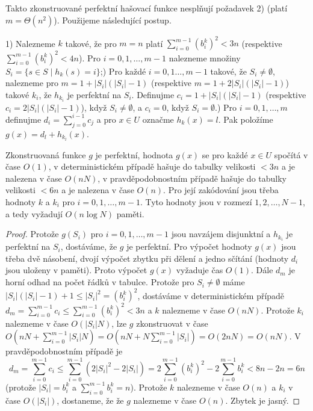 \documentclass[a4paper,12pt]{article}
\begin{document}
Takto zkonstruované perfektní hašovací funkce 
nesplňují poža\-davek 2) (platí $m=\Theta (n^2)$).  Použijeme následující 
postup. 

1) Nalezneme $k$ takové, že pro $m=n$ platí 
$\sum_{i=0}^{m-1}(b_i^k)^2<3n$ (respektive $\sum_{i=0}^{m-1}(b_i^
k)^2<4n$).  Pro 
$i=0,1,\dots,m-1$ nalezneme množiny 
$S_i=\{s\in S\mid h_k(s)=i\}$;) Pro každé $i=0,1\dots,m-1$ takové, že $S_i\ne\emptyset$, 
nalezneme pro $m=1+|S_i|(|S_i|-1)$ (respektive $m=1+2|S_i|(|S_i|-
1)$) 
takové $k_i$, že $h_{k_i}$ je perfektní na $S_i$. Definujme 
$c_i=1+|S_i|(|S_i|-1)$ (respektive $c_i=2|S_i|(|S_i|-1)$), když 
$S_i\ne\emptyset$, a $c_i=0$, když 
$S_i=\emptyset$.) Pro $i=0,1,\dots,m$ definujme $d_i=\sum_{j=0}^{i-1}c_j$ a pro $
x\in U$ 
označme $h_k(x)=l$. Pak položíme $g(x)=d_l+h_{k_l}(x)$.

\begin{veta}Zkonstruovaná funkce $g$ je perfektní, 
hodnota $g(x)$ se pro každé $x\in U$ spočítá v čase $
O(1)$, 
v deterministickém přípa\-dě hašuje do tabulky velikosti 
$<3n$ a je nalezena v čase $O(nN)$, v pravděpodobnostním 
přípa\-dě hašuje do tabulky velikosti $<6n$ a je nalezena 
v čase $O(n)$. Pro její zakódování jsou třeba hodnoty $
k$ a 
$k_i$ pro $i=0,1,\dots,m-1$. Tyto hodnoty jsou v rozmezí 
$1,2,\dots,N-1$, a tedy vyžadují $O(n\log N)$ paměti.
\end{veta}

\begin{proof}Protože $g(S_i)$ pro $i=0,1,\dots,m-1$ 
jsou navzájem disjunktní a $h_{k_i}$ je perfektní na $S_
i$, 
dostáváme, že $g$ je perfektní. Pro výpočet hodnoty $
g(x)$ 
jsou třeba dvě násobení, dvojí výpočet zbytku při 
dělení a jedno sčítání (hodnoty $d_i$ jsou uloženy v 
paměti). Proto výpočet $g(x)$ vyžaduje čas $O(1)$. Dále 
$d_m$ je horní odhad na počet řádků v tabulce. 
Protože pro $S_i\ne\emptyset$ máme $|S_i|(|S_i|-1)+1\le |S_
i|^2=(b_i^k)^2$, 
dostáváme v deterministickém případě 
$d_m=\sum_{i=0}^{m-1}c_i\le\sum_{i=0}^{m-1}(b_i^k)^2<3n$ a $k$ nalezneme v čase 
$O(nN)$. Protože $k_i$ nalezneme v čase $O(|S_i|N)$, lze $g$ 
zkonstruovat v čase 
$O(nN+\sum_{i=0}^{m-1}|S_i|N)=O(nN+N\sum_{i=0}^{m-1}|S_i|)=O(2nN)
=O(nN)$. 
V pravděpodob\-nostním případě je 
$$d_m=\sum_{i=0}^{m-1}c_i\le\sum_{i=0}^{m-1}(2|S_i|^2-2|S_i|)=2\sum_{
i=0}^{m-1}(b_i^k)^2-2\sum_{i=0}^{m-1}b_i^k<8n-2n=6n$$
(protože $|S_i|=b_i^k$ a $\sum_{i=0}^{m-1}b_i^k=n$). Protože $
k$ nalezneme v čase $O(n)$ a $k_i$ v čase $O(|S_i|)$, dostaneme, že 
že $g$ nalezneme v čase $O(n)$. Zbytek je jasný.
\end{proof}
\end{document}
